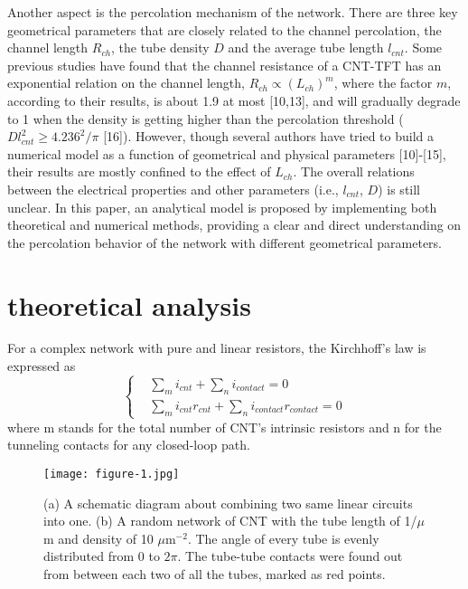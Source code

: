 \documentclass[letterpaper, 10 pt, conference]{ieeeconf}
\begin{document}
Another aspect is the percolation mechanism of the network. There are three key geometrical parameters that are closely related to the channel percolation, the channel length $R_{ch}$, the tube density $D$ and the average tube length $l_{cnt}$. Some previous studies have found that the channel resistance of a CNT-TFT has an exponential relation on the channel length, $R_{ch}\propto(L_{ch})^m$, where the factor $m$, according to their results, is about 1.9 at most [10,13], and will gradually degrade to 1 when the density is getting higher than the percolation threshold ($Dl_{cnt}^2\geq4.236^2/\pi$ [16]). However, though several authors have tried to build a numerical model as a function of geometrical and physical parameters [10]-[15], their results are mostly confined to the effect of $L_{ch}$. The overall relations between the electrical properties and other parameters (i.e., $l_{cnt}$, $D$) is still unclear. In this paper, an analytical model is proposed by implementing both theoretical and numerical methods, providing a clear and direct understanding on the percolation behavior of the network with different geometrical parameters.

\section{theoretical analysis}

For a complex network with pure and linear resistors, the Kirchhoff's law is expressed as
\begin{equation}
  \left\{
  \begin{aligned}
    &\sum_m i_{cnt}+\sum_n i_{contact}=0 \\
    &\sum_m i_{cnt}r_{cnt}+\sum_ni_{contact}r_{contact}=0
  \end{aligned}
  \right.
\end{equation}
where m stands for the total number of CNT's intrinsic resistors and n for the tunneling contacts for any closed-loop path.

\begin{figure}[!h]
  \texttt{[image: figure-1.jpg]}
  \caption{(a) A schematic diagram about combining two same linear circuits into one. (b) A random network of CNT with the tube length of 1/$\mu$m and density of 10 $\mu$m$^{-2}$. The angle of every tube is evenly distributed from 0 to $2\pi$. The tube-tube contacts were found out from between each two of all the tubes, marked as red points.
  }
\end{figure}
\end{document}
